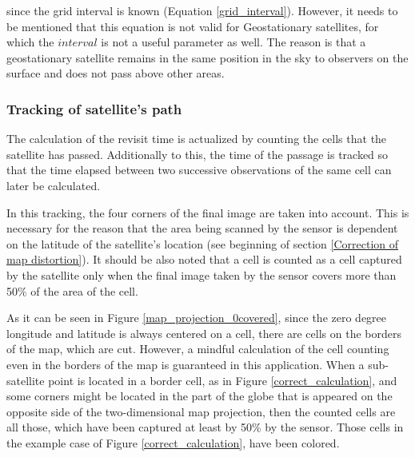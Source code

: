 since the grid interval is known (Equation \ref{grid_interval}). However, it needs to be mentioned that this equation is not valid for Geostationary satellites, for which the $\textit{interval}$ is not a useful parameter as well. The reason is that a geostationary satellite remains in the same position in the sky to observers on the surface and does not pass above other areas.


\bigskip
\subsubsection{Tracking of satellite's path}
\bigskip

The calculation of the revisit time is actualized by counting the cells that the satellite has passed. Additionally to this, the time of the passage is tracked so that the time elapsed between two successive observations of the same cell can later be calculated. 

In this tracking, the four corners of the final image are taken into account. This is necessary for the reason that the area being scanned by the sensor is dependent on the latitude of the satellite's location (see beginning of section \ref{Correction of map distortion}). It should be also noted that a cell is counted as a cell captured by the satellite only when the final image taken by the sensor covers more than 50\% of the area of the cell.

As it can be seen in Figure \ref{map_projection_0covered}, since the zero degree longitude and latitude is always centered on a cell, there are cells on the borders of the map, which are cut. However, a mindful calculation of the cell counting even in the borders of the map is guaranteed in this application. When a sub-satellite point is located in a border cell, as in Figure \ref{correct_calculation}, and some corners might be located in the part of the globe that is appeared on the opposite side of the two-dimensional map projection, then the counted cells are all those, which have been captured at least by 50\% by the sensor. Those cells in the example case of Figure \ref{correct_calculation}, have been colored.

